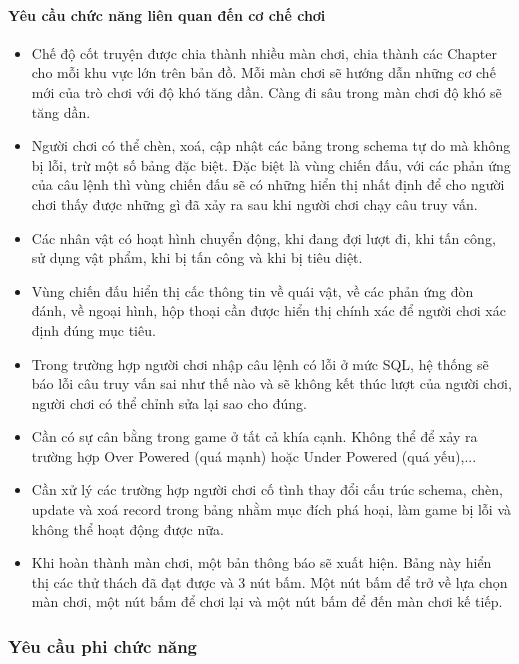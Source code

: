 \paragraph{Yêu cầu chức năng liên quan đến cơ chế chơi}
\begin{itemize}
	\item Chế độ cốt truyện được chia thành nhiều màn chơi, chia thành các Chapter cho mỗi khu vực lớn trên bản đồ. Mỗi màn chơi sẽ hướng dẫn những cơ chế mới của trò chơi với độ khó tăng dần. Càng đi sâu trong màn chơi độ khó sẽ tăng dần. 
	\item Người chơi có thể chèn, xoá, cập nhật các bảng trong schema tự do mà không bị lỗi, trừ một số bảng đặc biệt. Đặc biệt là vùng chiến đấu, với các phản ứng của câu lệnh thì vùng chiến đấu sẽ có những hiển thị nhất định để cho người chơi thấy được những gì đã xảy ra sau khi người chơi chạy câu truy vấn.
	\item Các nhân vật có hoạt hình chuyển động, khi đang đợi lượt đi, khi tấn công, sử dụng vật phẩm, khi bị tấn công và khi bị tiêu diệt.
	\item Vùng chiến đấu hiển thị cấc thông tin về quái vật, về các phản ứng đòn đánh, về ngoại hình, hộp thoại cần được hiển thị chính xác để người chơi xác định đúng mục tiêu.
	\item Trong trường hợp người chơi nhập câu lệnh có lỗi ở mức SQL, hệ thống sẽ báo lỗi câu truy vấn sai như thế nào và sẽ không kết thúc lượt của người chơi, người chơi có thể chỉnh sửa lại sao cho đúng. 
	\item Cần có sự cân bằng trong game ở tất cả khía cạnh. Không thể để xảy ra trường hợp Over Powered (quá mạnh) hoặc Under Powered (quá yếu),...
	\item Cần xử lý các trường hợp người chơi cố tình thay đổi cấu trúc schema, chèn, update và xoá record trong bảng nhằm mục đích phá hoại, làm game bị lỗi và không thể hoạt động được nữa.
	\item Khi hoàn thành màn chơi, một bản thông báo sẽ xuất hiện. Bảng này hiển thị các thử thách đã đạt được và 3 nút bấm. Một nút bấm để trở về lựa chọn màn chơi, một nút bấm để chơi lại và một nút bấm để đến màn chơi kế tiếp.
	
\end{itemize}


\subsubsection{Yêu cầu phi chức năng}

